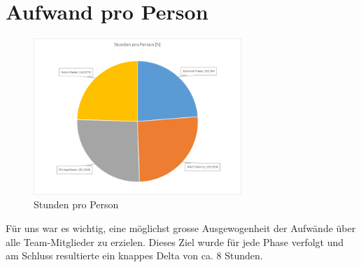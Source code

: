 	\section{Aufwand pro Person}
        \begin{figure}
            \vspace{-25pt}
            \begin{center}
                \includegraphics[width=0.7\textwidth]{content/schlussbericht/images/zeit_nach_person.png}
            \end{center}
            \vspace{-20pt}
            \caption{Stunden pro Person}
        \end{figure}
        Für uns war es wichtig, eine möglichst grosse Ausgewogenheit der Aufwände über alle Team-Mitglieder zu erzielen. Dieses Ziel wurde für jede Phase verfolgt und am Schluss resultierte ein knappes Delta von ca. 8 Stunden.
        \vspace{4cm}
	
    \newpage
